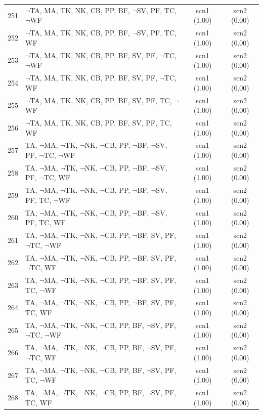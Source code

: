 \documentclass[12pt]{article}
\begin{document}
\begin{longtable}{|l|l|c|c|}
251 & $\neg$TA, MA, TK, NK, CB, PP, BF, $\neg$SV, PF, TC, $\neg$WF & scn1 (1.00) & scn2 (0.00)\\
252 & $\neg$TA, MA, TK, NK, CB, PP, BF, $\neg$SV, PF, TC, WF & scn1 (1.00) & scn2 (0.00)\\
253 & $\neg$TA, MA, TK, NK, CB, PP, BF, SV, PF, $\neg$TC, $\neg$WF & scn1 (1.00) & scn2 (0.00)\\
254 & $\neg$TA, MA, TK, NK, CB, PP, BF, SV, PF, $\neg$TC, WF & scn1 (1.00) & scn2 (0.00)\\
255 & $\neg$TA, MA, TK, NK, CB, PP, BF, SV, PF, TC, $\neg$WF & scn1 (1.00) & scn2 (0.00)\\
256 & $\neg$TA, MA, TK, NK, CB, PP, BF, SV, PF, TC, WF & scn1 (1.00) & scn2 (0.00)\\
257 & TA, $\neg$MA, $\neg$TK, $\neg$NK, $\neg$CB, PP, $\neg$BF, $\neg$SV, PF, $\neg$TC, $\neg$WF & scn1 (1.00) & scn2 (0.00)\\
258 & TA, $\neg$MA, $\neg$TK, $\neg$NK, $\neg$CB, PP, $\neg$BF, $\neg$SV, PF, $\neg$TC, WF & scn1 (1.00) & scn2 (0.00)\\
259 & TA, $\neg$MA, $\neg$TK, $\neg$NK, $\neg$CB, PP, $\neg$BF, $\neg$SV, PF, TC, $\neg$WF & scn1 (1.00) & scn2 (0.00)\\
260 & TA, $\neg$MA, $\neg$TK, $\neg$NK, $\neg$CB, PP, $\neg$BF, $\neg$SV, PF, TC, WF & scn1 (1.00) & scn2 (0.00)\\
261 & TA, $\neg$MA, $\neg$TK, $\neg$NK, $\neg$CB, PP, $\neg$BF, SV, PF, $\neg$TC, $\neg$WF & scn1 (1.00) & scn2 (0.00)\\
262 & TA, $\neg$MA, $\neg$TK, $\neg$NK, $\neg$CB, PP, $\neg$BF, SV, PF, $\neg$TC, WF & scn1 (1.00) & scn2 (0.00)\\
263 & TA, $\neg$MA, $\neg$TK, $\neg$NK, $\neg$CB, PP, $\neg$BF, SV, PF, TC, $\neg$WF & scn1 (1.00) & scn2 (0.00)\\
264 & TA, $\neg$MA, $\neg$TK, $\neg$NK, $\neg$CB, PP, $\neg$BF, SV, PF, TC, WF & scn1 (1.00) & scn2 (0.00)\\
265 & TA, $\neg$MA, $\neg$TK, $\neg$NK, $\neg$CB, PP, BF, $\neg$SV, PF, $\neg$TC, $\neg$WF & scn1 (1.00) & scn2 (0.00)\\
266 & TA, $\neg$MA, $\neg$TK, $\neg$NK, $\neg$CB, PP, BF, $\neg$SV, PF, $\neg$TC, WF & scn1 (1.00) & scn2 (0.00)\\
267 & TA, $\neg$MA, $\neg$TK, $\neg$NK, $\neg$CB, PP, BF, $\neg$SV, PF, TC, $\neg$WF & scn1 (1.00) & scn2 (0.00)\\
268 & TA, $\neg$MA, $\neg$TK, $\neg$NK, $\neg$CB, PP, BF, $\neg$SV, PF, TC, WF & scn1 (1.00) & scn2 (0.00)\\

\end{longtable}
\end{document}
